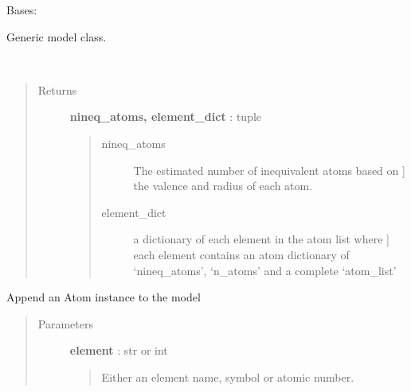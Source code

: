 \documentclass[letterpaper,10pt,english]{sphinxmanual}
\begin{document}

\begin{fulllineitems}
\label{modules:phaseshifts.model.Model}
Bases: 

Generic model class.

\begin{fulllineitems}
\label{modules:phaseshifts.model.Model._nineq_atoms}~\begin{quote}\begin{description}
\item[{Returns}] \leavevmode
\textbf{nineq\_atoms, element\_dict} : tuple
\begin{quote}
\begin{description}
\item[{nineq\_atoms}] \leavevmode{[}The estimated number of inequivalent atoms based on {]}
the valence and radius of each atom.

\item[{element\_dict}] \leavevmode{[}a dictionary of each element in the atom list where {]}
each element contains an atom dictionary of `nineq\_atoms', 
`n\_atoms' and a complete `atom\_list'

\end{description}
\end{quote}

\end{description}\end{quote}

\end{fulllineitems}


\begin{fulllineitems}
\label{modules:phaseshifts.model.Model.add_atom}
Append an Atom instance to the model
\begin{quote}\begin{description}
\item[{Parameters}] \leavevmode
\textbf{element} : str or int
\begin{quote}

Either an element name, symbol or atomic number.
\end{quote}


\end{description}
\end{quote}
\end{fulllineitems}
\end{fulllineitems}
\end{document}

